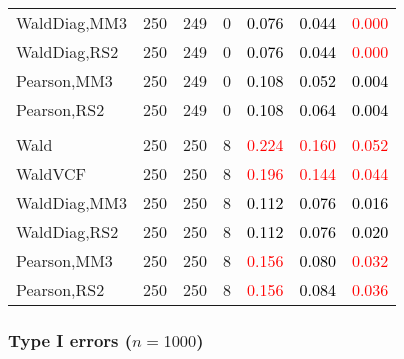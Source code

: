 \documentclass[
]{article}
\begin{document}
\begin{table}[H]
{\begin{tabular}[t]{lrrrrrr}
\hspace{1em}WaldDiag,MM3 & 250 & 249 & 0 & \textcolor{black}{0.076} & \textcolor{black}{0.044} & \textcolor{red}{0.000}\\
\hspace{1em}WaldDiag,RS2 & 250 & 249 & 0 & \textcolor{black}{0.076} & \textcolor{black}{0.044} & \textcolor{red}{0.000}\\
\hspace{1em}Pearson,MM3 & 250 & 249 & 0 & \textcolor{black}{0.108} & \textcolor{black}{0.052} & \textcolor{black}{0.004}\\
\hspace{1em}Pearson,RS2 & 250 & 249 & 0 & \textcolor{black}{0.108} & \textcolor{black}{0.064} & \textcolor{black}{0.004}\\
\addlinespace[0.3em]
\multicolumn{7}{l}{\textbf{3F 15V}}\\
\hspace{1em}Wald & 250 & 250 & 8 & \textcolor{red}{0.224} & \textcolor{red}{0.160} & \textcolor{red}{0.052}\\
\hspace{1em}WaldVCF & 250 & 250 & 8 & \textcolor{red}{0.196} & \textcolor{red}{0.144} & \textcolor{red}{0.044}\\
\hspace{1em}WaldDiag,MM3 & 250 & 250 & 8 & \textcolor{black}{0.112} & \textcolor{black}{0.076} & \textcolor{black}{0.016}\\
\hspace{1em}WaldDiag,RS2 & 250 & 250 & 8 & \textcolor{black}{0.112} & \textcolor{black}{0.076} & \textcolor{black}{0.020}\\
\hspace{1em}Pearson,MM3 & 250 & 250 & 8 & \textcolor{red}{0.156} & \textcolor{black}{0.080} & \textcolor{red}{0.032}\\
\hspace{1em}Pearson,RS2 & 250 & 250 & 8 & \textcolor{red}{0.156} & \textcolor{black}{0.084} & \textcolor{red}{0.036}\\
\bottomrule
\end{tabular}}
\endgroup{}
\end{table}

\hypertarget{type-i-errors-n1000-2}{%
\subsubsection{\texorpdfstring{Type I errors
(\(n=1000\))}{Type I errors (n=1000)}}\label{type-i-errors-n1000-2}}
\end{document}

